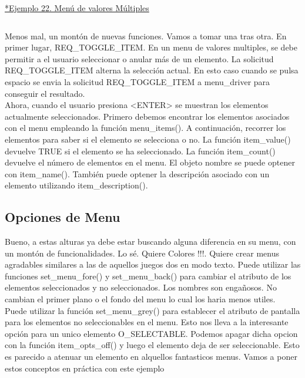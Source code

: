 \documentclass{article}
\begin{document}
\href{https://github.com/nasciiboy/NCURSES-Programming-HOWTO/blob/master/ncurses_programs/menus/menu_toggle.c}{*Ejemplo 22. Menú de valores Múltiples}
\inputminted{cpp}{./cpp/022_menu_valores_multiples.cpp}

Menos mal, un montón de nuevas funciones. Vamos a tomar una tras otra. En
primer lugar, REQ\_TOGGLE\_ITEM. En un menu de valores multiples, se debe
permitir a el usuario seleccionar o anular más de un elemento. La solicitud
REQ\_TOGGLE\_ITEM alterna la selección actual. En esto caso cuando se pulsa
espacio se envia la solicitud REQ\_TOGGLE\_ITEM a menu\_driver para conseguir el
resultado.\\

Ahora, cuando el usuario presiona <ENTER> se muestran los elementos actualmente
seleccionados. Primero debemos encontrar los elementos asociados con el menu
empleando la función menu\_items(). A continuación, recorrer los elementos para
saber si el elemento se selecciona o no. La función item\_value() devuelve TRUE
si el elemento se ha seleccionado. La función item\_count() devuelve el número
de elementos en el menu. El objeto nombre se puede optener con item\_name().
También puede optener la descripción asociado con un elemento utilizando
item\_description().

\subsection{Opciones de Menu}%
Bueno, a estas alturas ya debe estar buscando alguna diferencia en su menu, con
un montón de funcionalidades. Lo sé. Quiere Colores !!!. Quiere crear menus
agradables similares a las de aquellos juegos dos en modo texto. Puede utilizar
las funciones set\_menu\_fore() y set\_menu\_back() para cambiar el atributo de los
elementos seleccionados y no seleccionados. Los nombres son engañosos. No
cambian el primer plano o el fondo del menu lo cual los haria menos utiles.\\

Puede utilizar la función set\_menu\_grey() para establecer el atributo de
pantalla para los elementos no seleccionables en el menu. Esto nos lleva a la
interesante opción para un unico elemento O\_SELECTABLE. Podemos apagar dicha
opcion con la función item\_opts\_off() y luego el elemento deja de ser
seleccionable. Esto es parecido a atenuar un elemento en alquellos fantasticos
menus. Vamos a poner estos conceptos en práctica con este ejemplo\\
\end{document}

